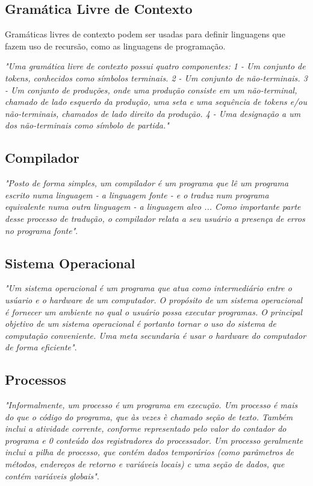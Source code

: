 \subsection{Gramática Livre de Contexto}

Gramáticas livres de contexto podem ser usadas para definir linguagens que fazem uso de recursão, como as linguagens de programação.

\textit{"Uma gramática livre de contexto possui quatro componentes: 
	1 - Um conjunto de tokens, conhecidos como símbolos terminais.
	2 - Um conjunto de não-terminais. 
	3 - Um conjunto de produções, onde uma produção consiste em um não-terminal, chamado de lado esquerdo da produção, uma seta e uma sequência de tokens e/ou não-terminais, chamados de lado direito da produção.
	4 - Uma designação a um dos não-terminais como símbolo de partida."}\citep[p.12]{aho2008compiladores}


\subsection{Compilador}

\textit{"Posto de forma simples, um compilador é um programa que lê um programa escrito numa linguagem - a linguagem fonte - e o traduz num programa equivalente numa outra linguagem - a linguagem alvo ... Como importante parte desse processo de tradução, o compilador relata a seu usuário a presença de erros no programa fonte"}.\citep[p.1]{aho2008compiladores}


\subsection{Sistema Operacional}
\textit{"Um sistema operacional é um programa que atua como intermediário entre o usúario e o hardware de um computador. O propósito de um sistema operacional é fornecer um ambiente no qual o usuário possa executar programas. O principal objetivo de um sistema operacional é portanto tornar o uso do sistema de computação conveniente. Uma meta secundaria é usar o hardware do computador de forma eficiente"}. \citep[p.3]{silberschatz2008sistemas}

\subsection{Processos}

\textit{"Informalmente, um processo é um programa em execução. Um processo é mais do que o código do programa,
	que às vezes è chamado seção de texto. Também inclui a atividade corrente, conforme representado pelo
	valor do contador do programa e 0 conteúdo dos registradores do processador. Um processo geralmente inclui
	a pilha de processo, que contém dados temporários (como parâmetros de métodos, endereços de retorno
	e variáveis locais) c uma seção de dados, que contém variáveis globais"}. \citep[p.63]{silberschatz2008sistemas}

